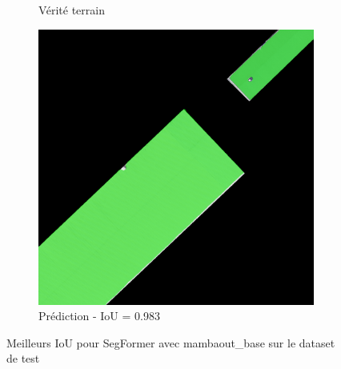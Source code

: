 \begin{figure}[H]
\begin{subfigure}{0.32\textwidth}
    \caption{Vérité terrain}
\end{subfigure}
\hfill
\begin{subfigure}{0.32\textwidth}
    \includegraphics[width=\textwidth]{02-main//figures/ch4/kfold_ensembles/segformer_tu-mambaout_base/best_cases/best_2_iou0.983_24961121_tile_15_10_cc6553_overlay_pred.png}
    \caption{Prédiction - IoU = 0.983}
\end{subfigure}

\caption{Meilleurs IoU pour SegFormer avec mambaout\_base sur le dataset de test}
\label{fig:segformer_mambaoutbase_best_cases}
\end{figure}


